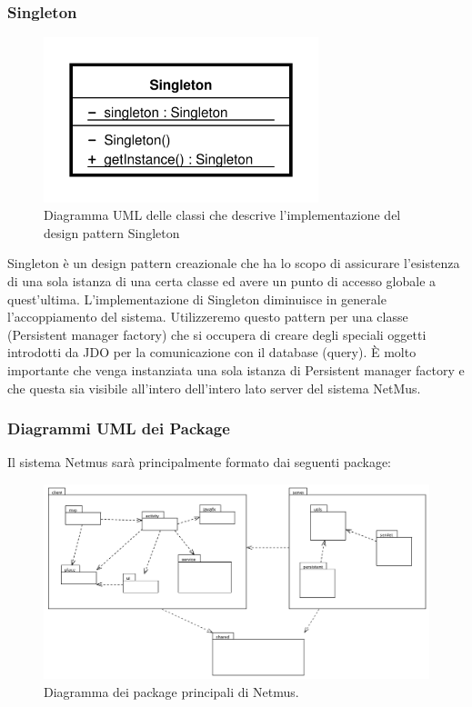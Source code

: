 \subsubsection{Singleton}
\begin{figure}[h]
\centering
\includegraphics[width=8cm]{img/ST/Singleton.png}
\caption{Diagramma UML delle classi che descrive l'implementazione del design
pattern Singleton}
\end{figure}
Singleton \`e un design pattern creazionale che ha lo scopo di assicurare
l'esistenza di una sola istanza di una certa classe ed avere un punto di accesso
globale a quest'ultima. 
L'implementazione di Singleton diminuisce in generale l'accoppiamento del
sistema.
Utilizzeremo questo pattern per una classe (Persistent manager factory) che si
occupera di creare degli speciali oggetti introdotti da JDO per la
comunicazione con il database (query). \`E molto importante che venga instanziata una sola
istanza di Persistent manager factory e che questa sia visibile all'intero
dell'intero lato server del sistema NetMus. 

\newpage
\subsubsection{Diagrammi UML dei Package}
Il sistema Netmus sar\`a principalmente formato dai seguenti package:
\begin{figure}[h]
  \centering
  \includegraphics[width=16cm]{img/ST/PackageGeneric.png}
\caption{Diagramma dei package principali di Netmus.}
\end{figure}

